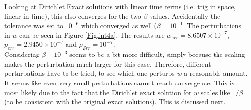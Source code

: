 \documentclass[11pt, a4paper]{article}
\theoremstyle{definition}
\begin{document}
Looking at Dirichlet Exact solutions with linear time terms (i.e. trig in space, linear in time), this also converges for the two $\beta$ values. Accidentally the tolerance was set to $10^{-6}$ which converged as well ($\beta = 10^{-1}$. The perturbations in $w$ can be seen in Figure \ref{Figlint4a}.
The results are $w_{err} = 8.6507 \times 10^{-7}$, $p_{err} = 2.9450 \times 10^{-7}$ and $\rho_{Err}= 10^{-7}$. \\
Considering $\beta+10^{-3}$ seems to be a bit more difficult, simply because the scaling makes the perturbation much larger for this case. Therefore, different perturbations have to be tried, to see which one perturbs $w$ a reasonable amount. It seems like even very small perturbations cannot reach convergence. This is most likely due to the fact that the Dirichlet exact solution for $w$ scales like $1/\beta$ (to be consistent with the original exact solutions). This is discussed next.\\
\end{document}
